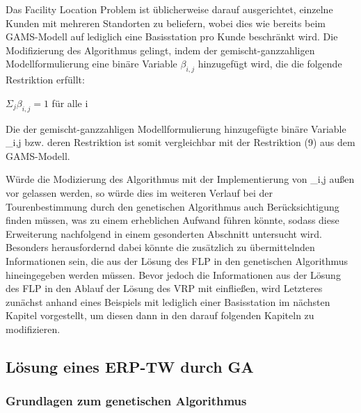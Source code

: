 \documentclass[a4paper,12pt,parskip,bibtotoc,liststotoc]{article}
\begin{document}
Das Facility Location Problem ist üblicherweise darauf ausgerichtet, einzelne Kunden mit mehreren Standorten zu beliefern, wobei dies wie bereits beim GAMS-Modell auf lediglich eine Basisstation pro Kunde beschränkt wird.
Die Modifizierung des Algorithmus gelingt, indem der gemischt-ganzzahligen Modellformulierung eine binäre Variable $\beta_{i,j}$ hinzugefügt wird, die die folgende Restriktion erfüllt:

\begin{center}

$\Sigma_{j} \beta_{i,j} = 1$ für alle i

\end{center}

Die der gemischt-ganzzahligen Modellformulierung hinzugefügte binäre Variable \beta_{i,j} bzw. deren Restriktion ist somit vergleichbar mit der Restriktion (9) aus dem GAMS-Modell.

Würde die Modizierung des Algorithmus mit der Implementierung von \beta_{i,j} außen vor gelassen werden, so würde dies im weiteren Verlauf bei der Tourenbestimmung durch den genetischen Algorithmus auch Berücksichtigung finden müssen, was zu einem erheblichen Aufwand führen könnte, sodass diese Erweiterung nachfolgend in einem gesonderten Abschnitt untersucht wird.
Besonders herausfordernd dabei könnte die zusätzlich zu übermittelnden Informationen sein, die aus der Lösung des FLP in den genetischen Algorithmus hineingegeben werden müssen.
Bevor jedoch die Informationen aus der Lösung des FLP in den Ablauf der Lösung des VRP mit einfließen, wird Letzteres zunächst anhand eines Beispiels mit lediglich einer Basisstation im nächsten Kapitel vorgestellt, um diesen dann in den darauf folgenden Kapiteln zu modifizieren.


\subsection{Lösung eines ERP-TW durch GA}

\subsubsection{Grundlagen zum genetischen Algorithmus}
\end{document}
